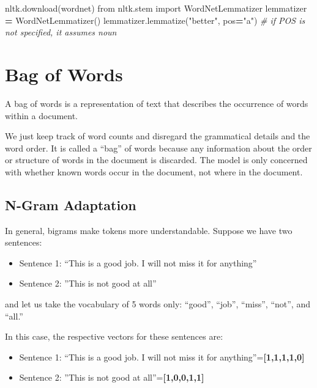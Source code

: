 \documentclass[
]{book}
\newenvironment{Shaded}{\begin{snugshade}}{\end{snugshade}}
\newcommand{\CommentTok}[1]{\textcolor[rgb]{0.56,0.35,0.01}{\textit{#1}}}
\newcommand{\ImportTok}[1]{#1}
\newcommand{\NormalTok}[1]{#1}
\newcommand{\OperatorTok}[1]{\textcolor[rgb]{0.81,0.36,0.00}{\textbf{#1}}}
\newcommand{\StringTok}[1]{\textcolor[rgb]{0.31,0.60,0.02}{#1}}
\providecommand{\tightlist}{%
  \setlength{\itemsep}{0pt}\setlength{\parskip}{0pt}}
\begin{document}
\begin{Shaded}
\begin{Highlighting}[]
\NormalTok{nltk.download(}\StringTok{\textquotesingle{}wordnet\textquotesingle{}}\NormalTok{)}
\ImportTok{from}\NormalTok{ nltk.stem }\ImportTok{import}\NormalTok{ WordNetLemmatizer}
\NormalTok{lemmatizer }\OperatorTok{=}\NormalTok{ WordNetLemmatizer()}
\NormalTok{lemmatizer.lemmatize(}\StringTok{"better"}\NormalTok{, pos}\OperatorTok{=}\StringTok{"a"}\NormalTok{) }\CommentTok{\# if POS is not specified, it assumes noun}
\end{Highlighting}
\end{Shaded}

\hypertarget{bag-of-words}{%
\section{Bag of Words}\label{bag-of-words}}

A bag of words is a representation of text that describes the occurrence of words within a document.

We just keep track of word counts and disregard the grammatical details and the word order. It is called a ``bag'' of words because any information about the order or structure of words in the document is discarded. The model is only concerned with whether known words occur in the document, not where in the document.

\hypertarget{n-gram-adaptation}{%
\subsection{N-Gram Adaptation}\label{n-gram-adaptation}}

In general, bigrams make tokens more understandable. Suppose we have two sentences:

\begin{itemize}
\tightlist
\item
  Sentence 1: ``This is a good job. I will not miss it for anything''
\item
  Sentence 2: ''This is not good at all''
\end{itemize}

and let us take the vocabulary of 5 words only: ``good'', ``job'', ``miss'', ``not'', and ``all.''

In this case, the respective vectors for these sentences are:

\begin{itemize}
\tightlist
\item
  Sentence 1: ``This is a good job. I will not miss it for anything''=\textbf{{[}1,1,1,1,0{]}}
\item
  Sentence 2: ''This is not good at all''=\textbf{{[}1,0,0,1,1{]}}
\end{itemize}
\end{document}
